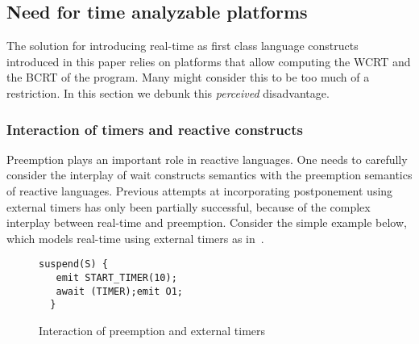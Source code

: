 \subsection{Need for time analyzable platforms}
\label{sec:need-time-analyzable}

The solution for introducing real-time as first class language
constructs introduced in this paper relies on platforms that allow
computing the WCRT and the BCRT of the program. Many might consider this
to be too much of a restriction. In this section we debunk this
\textit{perceived} disadvantage.

\subsubsection{Interaction of timers and reactive constructs}
\label{sec:inter-timers-react}


Preemption plays an important role in reactive languages. One needs to
carefully consider the interplay of wait constructs semantics with the
preemption semantics of reactive languages. Previous attempts at
incorporating postponement using external timers has only been partially
successful, because of the complex interplay between real-time and
preemption. Consider the simple example below, which models real-time
using external timers as in~\cite{rsh94}.

\begin{figure}[h!]
  \centering
	\vspace{-10pt}
		\begin{lstlisting}[style=sysj,basicstyle=\footnotesize\ttfamily,morekeywords={emit,trap,pause,exit,delay,suspend,await}]
  suspend(S) {
   emit START_TIMER(10); 
   await (TIMER);emit O1;
  }
		\end{lstlisting}
  \caption{Interaction of preemption and external timers}
  \label{fig:preemp}
	\vspace{-10pt}
\end{figure}


